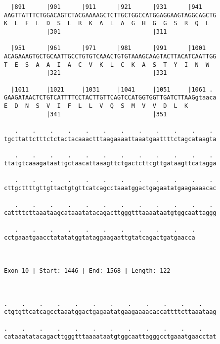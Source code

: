 \documentclass{article}
\begin{document}
\begin{Verbatim}
  |891      |901      |911      |921      |931      |941    
AAGTTATTTCTGGACAGTCTACGAAAAGCTCTTGCTGGCCATGGAGGAAGTAGGCAGCTG
K  L  F  L  D  S  L  R  K  A  L  A  G  H  G  G  S  R  Q  L  
            |301                          |311              
  
  |951      |961      |971      |981      |991      |1001   
ACAGAAAGTGCTGCAATTGCCTGTGTCAAACTGTGTAAAGCAAGTACTTACATCAATTGG
T  E  S  A  A  I  A  C  V  K  L  C  K  A  S  T  Y  I  N  W  
            |321                          |331              
  
  |1011     |1021     |1031     |1041     |1051     |1061 . 
GAAGATAACTCTGTCATTTTCCTACTTGTTCAGTCCATGGTGGTTGATCTTAAGgtaaca
E  D  N  S  V  I  F  L  L  V  Q  S  M  V  V  D  L  K        
            |341                          |351              
  
   .    .    .    .    .    .    .    .    .    .    .    . 
tgcttattctttctctactacaaactttaagaaaattaaatgaattttctagcataagta
                                                            
   .    .    .    .    .    .    .    .    .    .    .    . 
ttatgtcaaagataattgctaacattaaagttctgactcttcgttgataagttcatagga
                                                            
   .    .    .    .    .    .    .    .    .    .    .    . 
cttgcttttgttgttactgtgttcatcagcctaaatggactgagaatatgaagaaaacac
                                                            
   .    .    .    .    .    .    .    .    .    .    .    . 
cattttcttaaataagcataaatatacagacttgggtttaaaataatgtggcaattaggg
                                                            
   .    .    .    .    .    .    .    .    .    .    .
cctgaaatgaacctatatatggtataggaagaattgtatcagactgatgaacca
                                                      
                                                      
 
Exon 10 | Start: 1446 | End: 1568 | Length: 122



.    .    .    .    .    .    .    .    .    .    .    .    
ctgtgttcatcagcctaaatggactgagaatatgaagaaaacaccattttcttaaataag
                                                            
.    .    .    .    .    .    .    .    .    .    .    .    
cataaatatacagacttgggtttaaaataatgtggcaattagggcctgaaatgaacctat
                                                            

\end{Verbatim}
\end{document}
